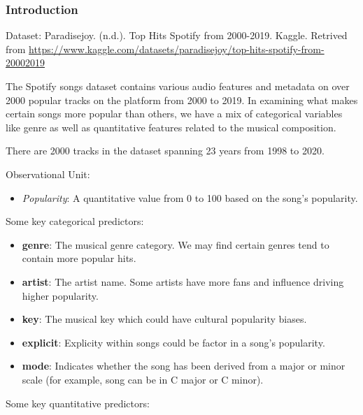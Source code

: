 \documentclass[
]{article}
\providecommand{\tightlist}{%
  \setlength{\itemsep}{0pt}\setlength{\parskip}{0pt}}
\begin{document}
\hypertarget{introduction}{%
\subsubsection{Introduction}\label{introduction}}

Dataset: Paradisejoy. (n.d.). Top Hits Spotify from 2000-2019. Kaggle.
Retrived from
\url{https://www.kaggle.com/datasets/paradisejoy/top-hits-spotify-from-20002019}

The Spotify songs dataset contains various audio features and metadata
on over 2000 popular tracks on the platform from 2000 to 2019. In
examining what makes certain songs more popular than others, we have a
mix of categorical variables like genre as well as quantitative features
related to the musical composition.

There are 2000 tracks in the dataset spanning 23 years from 1998 to
2020.

Observational Unit:

\begin{itemize}
\tightlist
\item
  \emph{Popularity}: A quantitative value from 0 to 100 based on the
  song's popularity.
\end{itemize}

Some key categorical predictors:

\begin{itemize}
\item
  \textbf{genre}: The musical genre category. We may find certain genres
  tend to contain more popular hits.
\item
  \textbf{artist}: The artist name. Some artists have more fans and
  influence driving higher popularity.
\item
  \textbf{key}: The musical key which could have cultural popularity
  biases.
\item
  \textbf{explicit}: Explicity within songs could be factor in a song's
  popularity.
\item
  \textbf{mode}: Indicates whether the song has been derived from a
  major or minor scale (for example, song can be in C major or C minor).
\end{itemize}

Some key quantitative predictors:
\end{document}
